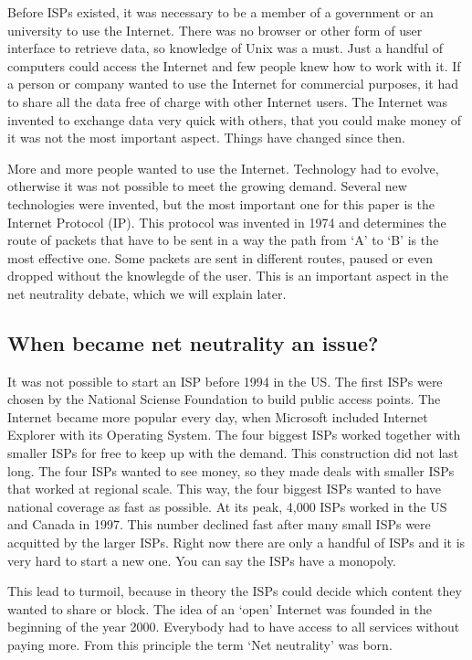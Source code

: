 Before ISPs existed, it was necessary to be a member of a government or an university to use the Internet. There was no browser or other form of user interface to retrieve data, so knowledge of Unix was a must. Just a handful of computers could access the Internet and few people knew how to work with it. If a person or company wanted to use the Internet for commercial purposes, it had to share all the data free of charge with other Internet users. The Internet was invented to exchange data very quick with others, that you could make money of it was not the most important aspect. Things have changed since then.

More and more people wanted to use the Internet. Technology had to evolve, otherwise it was not possible to meet the growing demand. Several new technologies were invented, but the most important one for this paper is the Internet Protocol (IP). This protocol was invented in 1974 and determines the route of packets that have to be sent in a way the path from `A' to `B' is the most effective one. Some packets are sent in different routes, paused or even dropped without the knowlegde of the user. This is an important aspect in the net neutrality debate, which we will explain later.

\subsection{When became net neutrality an issue?}
It was not possible to start an ISP before 1994 in the US. The first ISPs were chosen by the National Sciense Foundation to build public access points. The Internet became more popular every day,  when Microsoft included Internet Explorer with its Operating System. The four biggest ISPs worked together with smaller ISPs for free to keep up with the demand. This construction did not last long. The four ISPs wanted to see money, so they made deals with smaller ISPs that worked at regional scale. This way, the four biggest ISPs wanted to have national coverage as fast as possible. At its peak, 4,000 ISPs worked in the US and Canada in 1997. This number declined fast after many small ISPs were acquitted by the larger ISPs. Right now there are only a handful of ISPs and it is very hard to start a new one. You can say the ISPs have a monopoly.

This lead to turmoil, because in theory the ISPs could decide which content they wanted to share or block. The idea of an `open' Internet was founded in the beginning of the year 2000. Everybody had to have access to all services without paying more. From this principle the term `Net neutrality' was born.